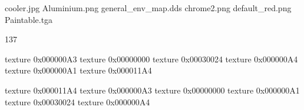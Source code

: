 cooler.jpg
Aluminium.png
general_env_map.dds
chrome2.png
default_red.png
Paintable.tga

137

texture 0x000000A3
texture 0x00000000
texture 0x00030024
texture 0x000000A4
texture 0x000000A1
texture 0x000011A4




texture 0x000011A4
texture 0x000000A3
texture 0x00000000
texture 0x000000A1
texture 0x00030024
texture 0x000000A4